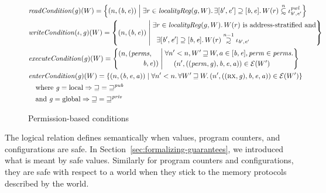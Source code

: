 \documentclass[acmsmall,review]{acmart}\settopmatter{printfolios=true}
\newcommand\subsetsim{\mathrel{\ooalign{\raise.2ex\hbox{$\subset$}\cr
      \hidewidth\lower.8ex\hbox{\scalebox{0.9}{$\sim$}}\hidewidth\cr}}}
\newcommand\supsetsim{\mathrel{\ooalign{\raise.2ex\hbox{$\supset$}\cr
      \hidewidth\lower.8ex\hbox{\scalebox{0.9}{$\sim$}}\hidewidth\cr}}}
\newcommand{\nsubsim}[1][n]{\stackrel{\tiny{#1}}{\subsetsim}}
\newcommand{\nsupsim}[1][n]{\stackrel{\tiny{#1}}{\supsetsim}}
\newcommand\dominique[1]{{\color{purple} \sf \footnotesize {DD: #1}}\\}
\newcommand{\var}[1]{\mathit{#1}}
\newcommand{\gl}{\var{g}}
\newcommand{\addr}{\var{a}}
\newcommand{\start}{\var{b}}
\newcommand{\addrend}{\var{e}}
\newcommand{\perm}{\var{perm}}
\newcommand{\pwl}{\var{pwl}}
\newcommand{\plainfun}[2]{
  \ifthenelse{\equal{#2}{}}
  {\mathit{#1}}
  {\mathit{#1}(#2)}
}
\newcommand{\readCond}[1]{\plainfun{readCondition}{#1}}
\newcommand{\writeCond}[1]{\plainfun{writeCondition}{#1}}
\newcommand{\execCond}[1]{\plainfun{executeCondition}{#1}}
\newcommand{\entryCond}[1]{\plainfun{enterCondition}{#1}}
\newcommand{\future}{\mathbin{\sqsupseteq}}
\newcommand{\futurewk}{\mathbin{\sqsupseteq}^{\var{pub}}}
\newcommand{\futurestr}{\mathbin{\sqsupseteq}^{\var{priv}}}
\newcommand{\asmType}{\plaindom{AsmType}}
\newcommand{\plaindom}[1]{\mathrm{#1}}
\newcommand{\intr}[2]{\mathcal{#1}}
\newcommand{\exprintr}[1]{\intr{E}{#1}}
\newcommand{\stder}{\exprintr{\asmType}}
\newcommand{\npair}[2][n]{\left(#1,#2 \right)}
\newcommand{\npairP}[2][n]{(#1,#2)}
\newcommand{\plainperm}[1]{\textsc{#1}}
\newcommand{\exec}{\plainperm{rx}}
\newcommand{\plainlocality}[1]{\mathrm{#1}}
\newcommand{\local}{\plainlocality{local}}
\newcommand{\glob}{\plainlocality{global}}
\begin{document}
{\begin{figure}[htbp]
  \centering
  \begin{align*}
  & \readCond{}(\gl)(W) =  \left\{ \npair{(\start,\addrend)} \; \middle| \;
       \exists r \in \var{localityReg}(g,W) \ldotp 
       \exists [\start',\addrend'] \supseteq [\start,\addrend] \ldotp W(r)\nsubsim[n] \iota_{\start',\addrend'}^\pwl 
    \right\}\\
  & \writeCond{}(\iota,\gl)(W) =  \left\{
    \npair{(\start,\addrend)}
    \; \middle| \;
    \begin{aligned}
      & \exists r \in \var{localityReg}(g,W) \ldotp W(r) \text{ is address-stratified and} \\
      & \;\; \exists [\start',\addrend'] \supseteq [\start,\addrend] \ldotp W(r)\nsupsim[n-1] \iota_{\start',\addrend'}
    \end{aligned} \right\}\\
  & \execCond{}(\gl)(W) = 
    \left\{
    \begin{multlined}
      \npairP{(\var{perms}, \\
        \start,\addrend)}
    \end{multlined}
     \; \middle| \;
    \begin{aligned}
      & \forall n' < n, W' \future W, a \in [\start,\addrend], \perm \in \var{perms} \ldotp \\
      & \;\;\;\; \npair[n']{((\perm,\gl),\start,\addrend,\addr)} \in \stder(W')\\
    \end{aligned} \right\} \\
  & \entryCond{}(\gl)(W) = 
    \left\{ \npair{(\start,\addrend,\addr)} \; \middle| \;
    \forall n' < n \ldotp \forall W' \future W \ldotp \npair[n']{((\exec,\gl),\start,\addrend,\addr)} \in \stder(W')
    \right\} \\
  & \quad \text{where } \gl = \local \Rightarrow \future = \futurewk \\
  & \quad \text{and } \gl = \glob \Rightarrow \future = \futurestr
  \end{align*}
\caption{Permission-based conditions}
\label{fig:perm-conds}
\end{figure}
}
The logical relation defines semantically when values, program counters, and
configurations are safe. In Section~\ref{sec:formalizing-guarantees}, we
introduced what is meant by safe values. Similarly for program counters and
configurations, they are safe with respect to a world when they stick to the
memory protocols described by the world.
\end{document}
